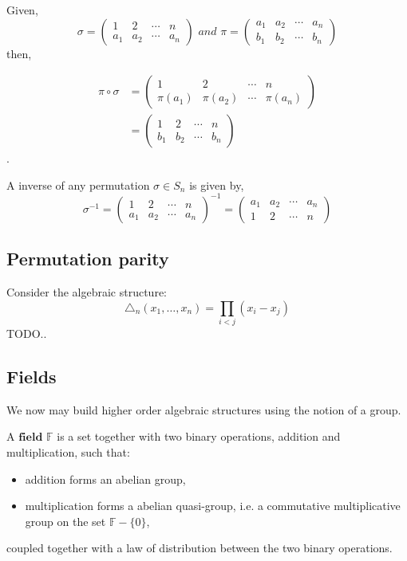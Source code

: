Given,
\[
 \sigma =
 \begin{pmatrix}
  1 & 2 & \cdots & n \\
  a_1 & a_2 & \cdots & a_n
 \end{pmatrix}
 \, \, and \, \,
 \pi =
 \begin{pmatrix}
  a_1 & a_2 & \cdots & a_n \\
  b_1 & b_2 & \cdots & b_n
 \end{pmatrix}
\]
then,

\begin{align*}
 \pi \circ \sigma &=
 \begin{pmatrix}
  1 & 2 & \cdots & n \\
  \pi(a_1) & \pi(a_2) & \cdots & \pi(a_n)
 \end{pmatrix}
 \\
 &=
 \begin{pmatrix}
  1 & 2 & \cdots & n \\
  b_1 & b_2 & \cdots & b_n
 \end{pmatrix}
\end{align*}
.

A inverse of any permutation $\sigma \in S_n$ is given by,
\[
 \sigma^{-1} =
 \begin{pmatrix}
  1 & 2 & \cdots & n \\
  a_1 & a_2 & \cdots & a_n
 \end{pmatrix}^{-1}
 =
 \begin{pmatrix}
  a_1 & a_2 & \cdots & a_n \\
  1 & 2 & \cdots & n
 \end{pmatrix}
\]

\subsection{Permutation parity}
Consider the algebraic structure:
\[
	\triangle_n (x_1, \dots , x_n) = \prod_{i<j} (x_i - x_j)
\]
TODO..

\subsection{Fields} %
\label{subsec:fields}
We now may build higher order algebraic structures using the notion of a group.

\begin{defn}[Field]
	A $\textbf{field}$ $\mathbb{F}$ is a set together with two binary operations, addition and multiplication, such that:
	\begin{itemize}
		\item addition forms an abelian group,
		\item multiplication forms a abelian quasi-group, i.e. a commutative multiplicative group on the set $\mathbb{F} - \{0\}$, 
	\end{itemize}
	coupled together with a law of distribution between the two binary operations.
\end{defn}
